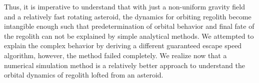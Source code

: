 %
\newline\newline
%
Thus, it is imperative to understand that with just a non-uniform gravity field and a relatively fast rotating asteroid, the dynamics for orbiting regolith become intangible enough such that predetermination of orbital behavior and final fate of the regolith can not be explained by simple analytical methods. We attempted to explain the complex behavior by deriving a different guaranteed escape speed algorithm, however, the method failed completely. We realize now that a numerical simulation method is a relatively better approach to understand the orbital dynamics of regolith lofted from an asteroid.


